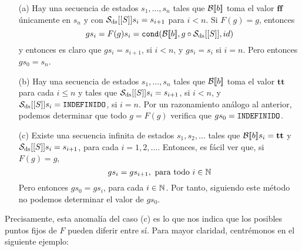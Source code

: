 \begin{itemize}
    \item[(a)] Hay una secuencia de estados $s_1, \dots, s_n$ tales que $\mathcal{B}[\![b]\!]$ toma el valor $\mathbf{ff}$ únicamente en $s_n$ y con $\mathcal{S}_{\mathrm{ds}}[[S]]s_i=s_{i+1}$ para $i <n$. Si $F(g) = g$, entonces
    $$gs_i = F(g)s_i = \texttt{cond}(\mathcal{B}[\![b]\!], g\circ \mathcal{S}_{\mathrm{ds}}[[S]], id)$$
    y entonces es claro que $gs_i = s_{i+1}$, si $i <n$, y $gs_i = s_i$ si $i = n$. Pero entonces $gs_0 = s_n$.
    \item[(b)] Hay una secuencia de estados $s_1, \dots, s_n$ tales que $\mathcal{B}[\![b]\!]$ toma el valor $\mathbf{tt}$ para cada $i \leq n$ y tales que $\mathcal{S}_{\mathrm{ds}}[[S]]s_i = s_{i+1}$, si $i <n$, y $\mathcal{S}_{\mathrm{ds}}[[S]]s_i = \texttt{INDEFINIDO}$, si $i = n$. Por un razonamiento análogo al anterior, podemos determinar que todo $g = F(g)$ verifica que $gs_0 = \texttt{INDEFINIDO}$.
    \item[(c)] Existe una secuencia infinita de estados $s_1, s_2, \dots$ tales que $\mathcal{B}[\![b]\!]s_i =\mathbf{tt}$ y $\mathcal{S}_{\mathrm{ds}}[[S]]s_i = s_{i+1}$, para cada $i=1, 2, \dots$. Entonces, es fácil ver que, si $F(g)=g$,
$$gs_{i} = gs_{i+1}, \text{ para todo } i \in \mathbb{N}$$
Pero entonces $gs_0 = gs_i$, para cada $i\in \mathbb{N}$. Por tanto, siguiendo este método no podemos determinar el valor de $gs_0$.
\end{itemize}

Precisamente, esta anomalía del caso (c) es lo que nos indica que los posibles puntos fijos de $F$ pueden diferir entre sí. Para mayor claridad, centrémonos en el siguiente ejemplo:

